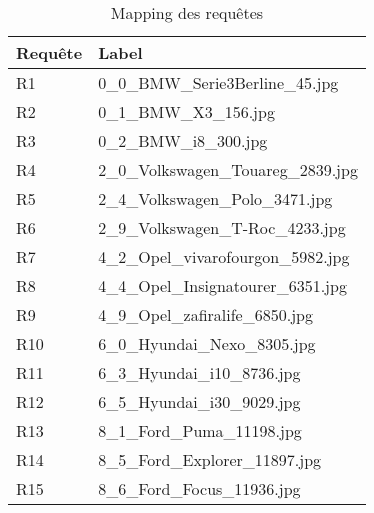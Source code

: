\begin{table}[H]
\centering
\begin{tabular}{ll}
\toprule
\textbf{Requête} & \textbf{Label} \\
\midrule
R1 & 0\_0\_BMW\_Serie3Berline\_45.jpg \\
R2 & 0\_1\_BMW\_X3\_156.jpg \\
R3 & 0\_2\_BMW\_i8\_300.jpg \\
R4 & 2\_0\_Volkswagen\_Touareg\_2839.jpg \\
R5 & 2\_4\_Volkswagen\_Polo\_3471.jpg \\
R6 & 2\_9\_Volkswagen\_T-Roc\_4233.jpg \\
R7 & 4\_2\_Opel\_vivarofourgon\_5982.jpg \\
R8 & 4\_4\_Opel\_Insignatourer\_6351.jpg \\
R9 & 4\_9\_Opel\_zafiralife\_6850.jpg \\
R10 & 6\_0\_Hyundai\_Nexo\_8305.jpg \\
R11 & 6\_3\_Hyundai\_i10\_8736.jpg \\
R12 & 6\_5\_Hyundai\_i30\_9029.jpg \\
R13 & 8\_1\_Ford\_Puma\_11198.jpg \\
R14 & 8\_5\_Ford\_Explorer\_11897.jpg \\
R15 & 8\_6\_Ford\_Focus\_11936.jpg \\
\bottomrule
\end{tabular}
\caption{Mapping des requêtes}
\label{tab:request_dict}
\end{table}
